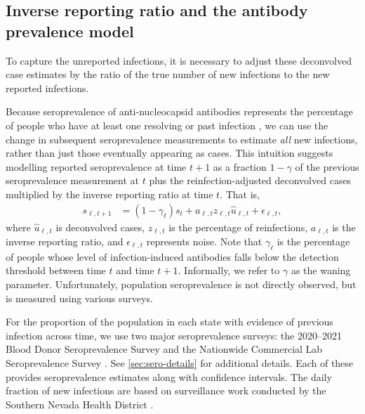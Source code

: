 \subsection{Inverse reporting ratio and the antibody prevalence model} 
\label{sec:report-ratio}

To capture the unreported infections, it is necessary to adjust these deconvolved case estimates by the ratio of the true number of new infections
to the new reported infections. 

Because seroprevalence of anti-nucleocapsid antibodies represents the percentage
of people who have at least one resolving or past infection \citep{cdc2020data},
we can use the change in subsequent seroprevalence measurements to estimate
\emph{all} new infections, rather than just those eventually appearing as cases.
This intuition suggests modelling reported seroprevalence at time $t+1$ as a
fraction $1-\gamma$ of the previous seroprevalence measurement at $t$ plus the
reinfection-adjusted deconvolved cases multiplied by
the inverse reporting ratio at time $t$. That is, 
\begin{align}
s_{\ell,t+1} &= (1 -\gamma_{\ell}) s_t + a_{\ell,t} z_{\ell,t} \widehat{u}_{\ell,t} + \epsilon_{\ell,t},
\end{align}
where $\widehat{u}_{\ell,t}$ is deconvolved cases,
$z_{\ell,t}$ is the percentage of reinfections, $a_{\ell,t}$ is the inverse
reporting ratio, and $\epsilon_{\ell,t}$ represents noise. Note that
$\gamma_{\ell}$ is the percentage of people whose level of infection-induced
antibodies falls below the detection threshold between time $t$ and time
$t+1$. Informally, we refer to $\gamma$ as the waning parameter. Unfortunately,
population seroprevalence is not directly observed, but is measured using
various surveys.

For the proportion of the population in each state with
evidence of previous infection across time, we use two major seroprevalence
surveys: the 2020--2021 Blood Donor Seroprevalence Survey and the Nationwide
Commercial Lab Seroprevalence Survey \citep{cdc2021blood, cdc2021comm}. See
\autoref{sec:sero-details} for additional details. Each of these provides
seroprevalence estimates along with confidence intervals.
The daily fraction of new infections are based on surveillance work conducted by
the Southern Nevada Health District \citep{ruff2022rapid}. 


